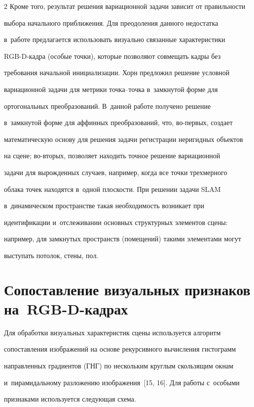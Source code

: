 \begin{multicols}{2}
Кроме того, результат решения вариационной задачи зависит от пра\-виль\-ности 

выбора начального приближения. Для преодоления данного недостатка 

в~работе предлагается использовать визуально связанные характеристики 

RGB-D-кад\-ра (особые точки), которые позволяют совмещать кадры без 

требования начальной инициализации. Хорн предложил решение условной 

вариационной задачи для метрики точ\-ка--точ\-ка в~замкнутой форме для 

ортогональных преобразований. В~данной работе получено решение 

в~замк\-ну\-той форме для аффинных преобразований, что, во-пер\-вых, создает 

математическую основу для решения задачи регистрации неригидных объектов 

на сцене; во-вто\-рых, позволяет находить точное решение вариационной 

задачи для вырожденных случаев, например, когда все точки трехмерного 

облака точек находятся в~одной плоскости. При решении задачи SLAM 

в~динамическом пространстве такая необходимость возникает при 

идентификации и~отслеживании основных структурных элементов сцены: 

например, для замк\-ну\-тых пространств (помещений) такими элементами могут 

выступать потолок, стены, пол.

  

\section{Сопоставление визуальных признаков на~RGB-D-кадрах}



  Для обработки визуальных характеристик \mbox{сцены} используется алгоритм 

сопоставления изоб\-ра\-же\-ний на основе рекурсивного вы\-чис\-ле\-ния гистограмм 

на\-прав\-лен\-ных градиентов (ГНГ) по нескольким круглым скользящим окнам 

и~\mbox{пирамидальному} разложению изображения~[15, 16]. Для работы с~особыми 

признаками используется сле\-ду\-ющая схема.


\end{multicols}

